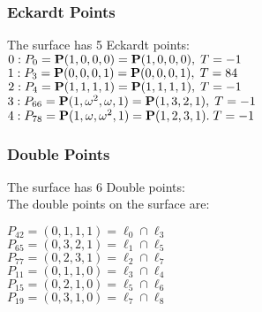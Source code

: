 \documentclass{article}
\newcommand{\bP}{{\bf P}}
\begin{document}
{\subsubsection*{Eckardt Points}
The surface has 5 Eckardt points:\\
$0 : P_{0}=\bP(1, 0, 0, 0) = \bP(1, 0, 0, 0),\; T= -1$\\
$1 : P_{3}=\bP(0, 0, 0, 1) = \bP(0, 0, 0, 1),\; T= 84$\\
$2 : P_{4}=\bP(1, 1, 1, 1) = \bP(1, 1, 1, 1),\; T= -1$\\
$3 : P_{66}=\bP(1, \omega^{2}, \omega , 1) = \bP(1, 3, 2, 1),\; T= -1$\\
$4 : P_{78}=\bP(1, \omega , \omega^{2}, 1) = \bP(1, 2, 3, 1).\; T= -1$\\
\subsubsection*{Double Points}
The surface has 6 Double points:\\
The double points on the surface are:\\
\begin{multicols}{2}
\noindent
$P_{42} = ( 0, 1, 1, 1 ) = \ell_{0} \cap \ell_{3} $\\
$P_{65} = ( 0, 3, 2, 1 ) = \ell_{1} \cap \ell_{5} $\\
$P_{77} = ( 0, 2, 3, 1 ) = \ell_{2} \cap \ell_{7} $\\
$P_{11} = ( 0, 1, 1, 0 ) = \ell_{3} \cap \ell_{4} $\\
$P_{15} = ( 0, 2, 1, 0 ) = \ell_{5} \cap \ell_{6} $\\
$P_{19} = ( 0, 3, 1, 0 ) = \ell_{7} \cap \ell_{8} $\\
\end{multicols}
}
\end{document}
